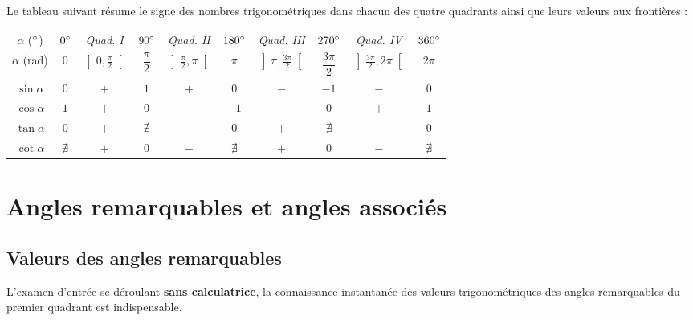 Le tableau suivant résume le signe des nombres trigonométriques dans chacun des quatre quadrants ainsi que leurs valeurs aux frontières :

\begin{center}
\renewcommand{\arraystretch}{1.35}
\small
\begin{tabular}{@{}cccccccccc@{}}
\toprule
$\alpha$ ($\degree$) & $0\degree$ & \textit{Quad. I} & $90\degree$ & \textit{Quad. II} & $180\degree$ & \textit{Quad. III} & $270\degree$ & \textit{Quad. IV} & $360\degree$ \\
$\alpha$ (rad) & $0$ & $\left]0, \frac{\pi}{2}\right[$ & $\dfrac{\pi}{2}$ & $\left]\frac{\pi}{2}, \pi\right[$ & $\pi$ & $\left]\pi, \frac{3\pi}{2}\right[$ & $\dfrac{3\pi}{2}$ & $\left]\frac{3\pi}{2}, 2\pi\right[$ & $2\pi$ \\
\midrule
$\sin\alpha$ & $0$ & $+$ & $1$ & $+$ & $0$ & $-$ & $-1$ & $-$ & $0$ \\
$\cos\alpha$ & $1$ & $+$ & $0$ & $-$ & $-1$ & $-$ & $0$ & $+$ & $1$ \\
$\tan\alpha$ & $0$ & $+$ & $\nexists$ & $-$ & $0$ & $+$ & $\nexists$ & $-$ & $0$ \\
$\cot\alpha$ & $\nexists$ & $+$ & $0$ & $-$ & $\nexists$ & $+$ & $0$ & $-$ & $\nexists$ \\
\bottomrule
\end{tabular}
\end{center}

\section{Angles remarquables et angles associés}

\subsection{Valeurs des angles remarquables}

L'examen d'entrée se déroulant \textbf{sans calculatrice}, la connaissance instantanée des valeurs trigonométriques des angles remarquables du premier quadrant est indispensable.

